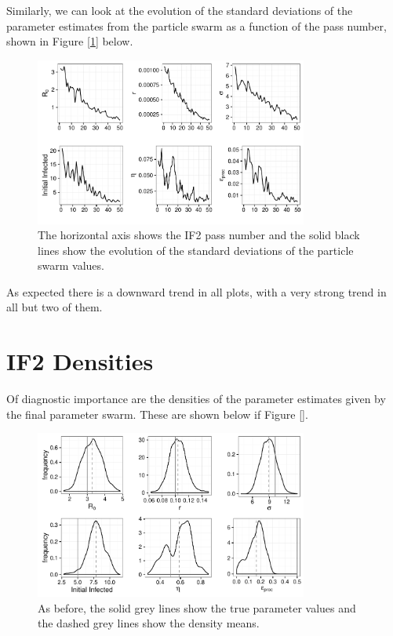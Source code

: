     Similarly, we can look at the evolution of the standard deviations of the parameter estimates from the particle swarm as a function of the pass number, shown in Figure [\ref{if2sdconvergence}] below.

    \begin{figure}[H]
        \centering
        \captionsetup{width=.8\linewidth}
        \includegraphics[width=0.8\textwidth]{./images/if2sdconvergence.pdf}
        \caption{The horizontal axis shows the IF2 pass number and the solid black lines show the evolution of the standard deviations of the particle swarm values.}
        \label{if2sdconvergence}
    \end{figure}

    As expected there is a downward trend in all plots, with a very strong trend in all but two of them.


\section{IF2 Densities}

	Of diagnostic importance are the densities of the parameter estimates given by the final parameter swarm. These are shown below if Figure [].

	\begin{figure}[H]
        \centering
        \captionsetup{width=.8\linewidth}
        \includegraphics[width=0.8\textwidth]{./images/if2kernels.pdf}
        \caption{As before, the solid grey lines show the true parameter values and the dashed grey lines show the density means.}
        \label{if2kernels}
    \end{figure}

